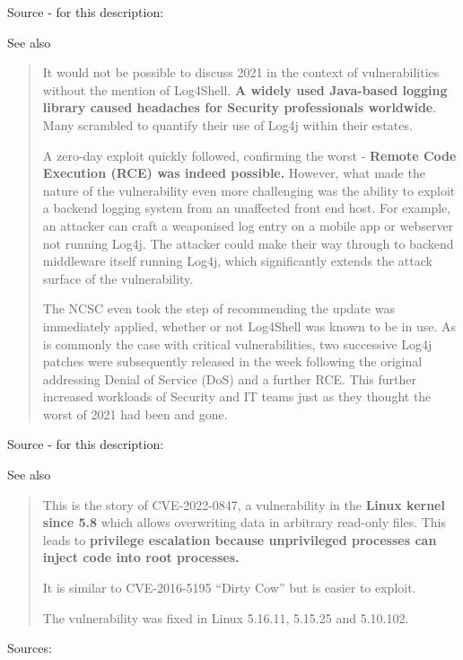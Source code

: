 \documentclass[Screen16to9,17pt]{foils}
\begin{document}
Source - for this description:\\

See also



\begin{quote}\small
It would not be possible to discuss 2021 in the context of vulnerabilities without the mention of Log4Shell. {\bf A widely used Java-based logging library caused headaches for Security professionals worldwide}. Many scrambled to quantify their use of Log4j within their estates.

A zero-day exploit quickly followed, confirming the worst - {\bf Remote Code Execution (RCE) was indeed possible.} However, what made the nature of the vulnerability even more challenging was the ability to exploit a backend logging system from an unaffected front end host. For example, an attacker can craft a weaponised log entry on a mobile app or webserver not running Log4j. The attacker could make their way through to backend middleware itself running Log4j, which significantly extends the attack surface of the vulnerability.

The NCSC even took the step of recommending the update was immediately applied, whether or not Log4Shell was known to be in use. As is commonly the case with critical vulnerabilities, two successive Log4j patches were subsequently released in the week following the original addressing Denial of Service (DoS) and a further RCE. This further increased workloads of Security and IT teams just as they thought the worst of 2021 had been and gone.
\end{quote}
Source - for this description:\\

See also 





\begin{quote}
This is the story of CVE-2022-0847, a vulnerability in the {\bf Linux kernel since 5.8} which allows overwriting data in arbitrary read-only files. This leads to {\bf privilege escalation because unprivileged processes can inject code into root processes.}

It is similar to CVE-2016-5195 “Dirty Cow” but is easier to exploit.

The vulnerability was fixed in Linux 5.16.11, 5.15.25 and 5.10.102.
\end{quote}
Sources:
\end{document}
